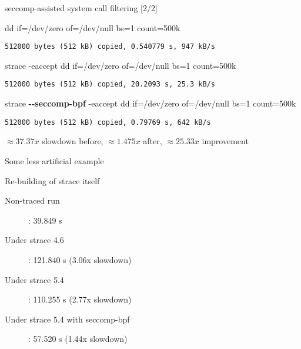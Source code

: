 \documentclass[unicode,aspectratio=169]{beamer}
\begin{document}
\begin{frame}[fragile]{seccomp-assisted system call filtering \hfill [2/2]}
\begin{block}{\large dd if=/dev/zero of=/dev/null bs=1 count=500k}
\begin{verbatim}
512000 bytes (512 kB) copied, 0.540779 s, 947 kB/s
\end{verbatim}
\end{block}
\begin{block}{\large strace -eaccept dd if=/dev/zero of=/dev/null bs=1 count=500k}
\begin{verbatim}
512000 bytes (512 kB) copied, 20.2093 s, 25.3 kB/s
\end{verbatim}
\end{block}
\begin{block}{\large strace \textbf{-{}-seccomp-bpf} -eaccept dd if=/dev/zero of=/dev/null bs=1 count=500k}
\begin{verbatim}
512000 bytes (512 kB) copied, 0.79769 s, 642 kB/s
\end{verbatim}
\end{block}
$\approx 37.37x$ slowdown before, $\approx 1.475x$ after, $\approx 25.33x$ improvement
\end{frame}

\begin{frame}[fragile]{Some less artificial example}
\begin{block}{\large Re-building of strace itself\footnotemark[1]}
\begin{description}
  \item[Non-traced run]: 39.849 s
  \item[Under strace 4.6]: 121.840 s (3.06x slowdown)
  \item[Under strace 5.4]: 110.255 s (2.77x slowdown)
  \item[Under strace 5.4 with seccomp-bpf]: 57.520 s (1.44x slowdown)
\end{description}
\end{block}
\end{frame}
\end{document}
